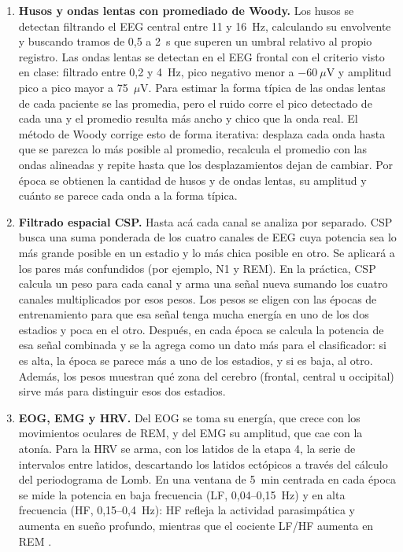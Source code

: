 \documentclass[11pt,a4paper]{article}
\begin{document}
\begin{enumerate}[label=\textbf{\arabic*.}, leftmargin=1.6em, itemsep=6pt, topsep=4pt]
\item \textbf{Husos y ondas lentas con promediado de Woody.} Los husos se
  detectan filtrando el EEG central entre 11 y 16~Hz, calculando su
  envolvente y buscando tramos de 0,5 a 2~s que superen un umbral
  relativo al propio registro. Las ondas lentas se detectan
  en el EEG frontal con el criterio visto en clase:
  filtrado entre 0,2 y 4~Hz, pico negativo menor a $-60~\mu$V y amplitud
  pico a pico mayor a 75~$\mu$V. Para estimar la forma típica de las
  ondas lentas de cada paciente se las promedia, pero el ruido corre el
  pico detectado de cada una y el promedio resulta
  más ancho y chico que la onda real. El método de Woody
  \cite{woody} corrige esto de forma iterativa: desplaza cada onda
  hasta que se parezca lo más posible al promedio, recalcula el promedio
  con las ondas alineadas y repite hasta que los desplazamientos dejan de
  cambiar. Por época se obtienen la cantidad de husos y de ondas lentas,
  su amplitud y cuánto se parece cada onda a la forma típica.

\item \textbf{Filtrado espacial CSP.} Hasta acá cada canal se analiza
  por separado. CSP \cite{ramoser} busca una suma ponderada de los cuatro
  canales de EEG cuya potencia sea lo más grande posible en un estadio y
  lo más chica posible en otro. Se aplicará a los pares más confundidos
  (por ejemplo, N1 y REM). En la práctica, CSP calcula un peso para cada
  canal y arma una señal nueva sumando los cuatro canales multiplicados
  por esos pesos. Los pesos se eligen con las épocas de entrenamiento para
  que esa señal tenga mucha energía en uno de los dos estadios y poca en
  el otro. Después, en cada época se calcula la potencia de esa señal
  combinada y se la agrega como un dato más para el clasificador: si es
  alta, la época se parece más a uno de los estadios, y si es baja, al
  otro. Además, los pesos muestran qué zona del cerebro (frontal, central
  u occipital) sirve más para distinguir esos dos estadios.

\item \textbf{EOG, EMG y HRV.} Del EOG se toma su energía, que crece con
  los movimientos oculares de REM, y del EMG su amplitud, que cae con la
  atonía. Para la HRV se arma, con los latidos de la etapa 4, la serie de
  intervalos entre latidos, descartando los latidos ectópicos a través del cálculo del periodograma de Lomb.
  En una ventana de 5~min centrada en cada época se mide la potencia en baja frecuencia
  (LF, 0,04--0,15~Hz) y en alta frecuencia (HF, 0,15--0,4~Hz): HF
  refleja la actividad parasimpática y aumenta en sueño profundo,
  mientras que el cociente LF/HF aumenta en REM \cite{taskforce}.


\end{enumerate}
\end{document}
